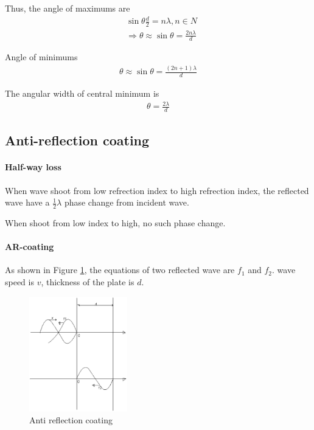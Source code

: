             Thus, the angle of maximums are
            \begin{align}
                & \sin \theta \frac{d}{2} = n \lambda, n \in N \\
                & \Rightarrow \theta \approx \sin \theta = \frac{2 n \lambda}{d}
            \end{align}

            Angle of minimums
            \begin{align}
                \theta \approx \sin \theta = \frac{(2n + 1) \lambda}{d}
            \end{align}

            The angular width of central minimum is
            \begin{align}
                \theta = \frac{2 \lambda}{d}
            \end{align}

    \subsection{Anti-reflection coating}
        \paragraph{Half-way loss}
            When wave shoot from low refrection index to high refrection index, the reflected wave have a $\frac{1}{2} \lambda$ phase change from incident wave.

            When shoot from low index to high, no such phase change.

        \paragraph{AR-coating}
            As shown in Figure \ref{ant_ref_coa}, the equations of two reflected wave are $f_1$ and $f_2$. wave speed is $v$, thickness of the plate is $d$.

            \begin{figure}[H]
                \begin{center}
                    \includegraphics[height=5cm]{wave_charts/ant_ref_coa.eps}
                \end{center}
                \caption{Anti reflection coating}
                \label{ant_ref_coa}
            \end{figure}
            
